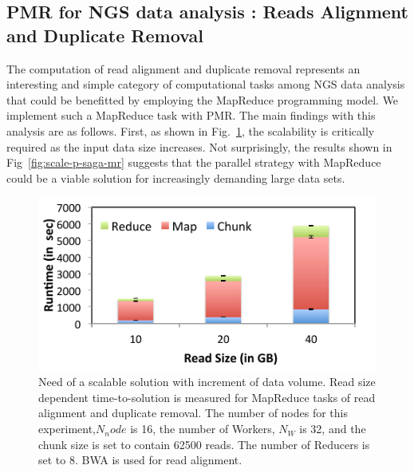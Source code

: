 \documentclass{sig-alternate}
\begin{document}
{\subsection{PMR for NGS data analysis : Reads Alignment and Duplicate
  Removal}

The computation of read alignment and duplicate removal represents an
interesting and simple category of computational tasks among NGS data
analysis that could be benefitted by employing the MapReduce
programming model.  We implement such a MapReduce task with PMR.  The
main findings with this analysis are as follows.  First, as shown in
Fig.~\ref{fig:read-size}, the scalability is critically required as
the input data size increases.  Not surprisingly, the results shown in
Fig~\ref{fig:scale-p-saga-mr} suggests that the parallel strategy with
MapReduce could be a viable solution for increasingly demanding large
data sets.

 \begin{figure}
 \centering
\includegraphics[scale=0.50]{figures/pj-smr-tts.pdf} 
\caption{\small Need of a scalable solution with increment of data volume.  Read size dependent time-to-solution is measured for MapReduce tasks of read alignment and duplicate removal.  The number of nodes for this experiment,$N_node$ is 16, the number of Workers, $N_W$ is 32, and the chunk size is set to contain 62500 reads.  The number of Reducers is set to 8. BWA is used for read alignment.}
  \label{fig:read-size} 
\end{figure}


}
\end{document}
